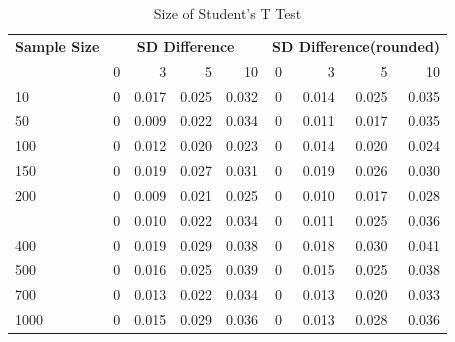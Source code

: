 \documentclass[]{article}
\begin{document}
\begin{longtable}[t]{lrrrrrrrr}
\caption{\label{tab:size-tables}Size of Student's T Test}\\
\toprule
\multicolumn{1}{c}{\bfseries Sample Size} & \multicolumn{4}{c}{\bfseries SD Difference} & \multicolumn{4}{c}{\bfseries SD Difference(rounded)} \\
\cmidrule(l{2pt}r{2pt}){1-1} \cmidrule(l{2pt}r{2pt}){2-5} \cmidrule(l{2pt}r{2pt}){6-9}
  & 0 & 3 & 5 & 10 & 0 & 3 & 5 & 10\\
\midrule
10 & 0 & 0.017 & 0.025 & 0.032 & 0 & 0.014 & 0.025 & 0.035\\
50 & 0 & 0.009 & 0.022 & 0.034 & 0 & 0.011 & 0.017 & 0.035\\
100 & 0 & 0.012 & 0.020 & 0.023 & 0 & 0.014 & 0.020 & 0.024\\
150 & 0 & 0.019 & 0.027 & 0.031 & 0 & 0.019 & 0.026 & 0.030\\
200 & 0 & 0.009 & 0.021 & 0.025 & 0 & 0.010 & 0.017 & 0.028\\
\addlinespace
300 & 0 & 0.010 & 0.022 & 0.034 & 0 & 0.011 & 0.025 & 0.036\\
400 & 0 & 0.019 & 0.029 & 0.038 & 0 & 0.018 & 0.030 & 0.041\\
500 & 0 & 0.016 & 0.025 & 0.039 & 0 & 0.015 & 0.025 & 0.038\\
700 & 0 & 0.013 & 0.022 & 0.034 & 0 & 0.013 & 0.020 & 0.033\\
1000 & 0 & 0.015 & 0.029 & 0.036 & 0 & 0.013 & 0.028 & 0.036\\
\bottomrule
\end{longtable}
\end{document}
